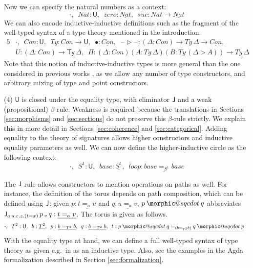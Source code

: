 \documentclass[dvipsnames]{lmcs} %
\makeatletter
\DeclareRobustCommand{\sqcdot}{\mathbin{\mathpalette\morphic@sqcdot\relax}}
\newcommand{\morphic@sqcdot}[2]{%
  \sbox\z@{$\m@th#1\centerdot$}%
  \ht\z@=.33333\ht\z@
  \vcenter{\box\z@}%
}
\newcommand{\U}{\mathsf{U}}
\newcommand{\ra}{\rightarrow}
\newcommand{\Ty}{\mathsf{Ty}}
\newcommand{\blank}{\mathord{\hspace{1pt}\text{--}\hspace{1pt}}}
\newcommand{\1}{\mathsf{1}} \renewcommand{\Pr}{\mathsf{Pr}}
\theoremstyle{plain}\newtheorem{satz}[thm]{Satz} %
\makeatother
\begin{document}
Now we can specify the natural numbers as a context:
\[
\boldsymbol{\cdot},\,\,\,Nat : \U,\,\,\,zero:\underline{Nat},\,\,\,suc:Nat\ra\underline{Nat}
\]
We can also encode inductive-inductive definitions such as the
fragment of the well-typed syntax of a type theory mentioned in the
introduction:
\begin{alignat*}{5}
  & \boldsymbol{\cdot},\,\,\,Con:\U,\,\,\,Ty:Con\ra\U,\,\,\,\bullet:\underline{Con},\,\,\,\blank\rhd\blank:(\Delta:Con)\ra Ty\,\Delta\ra\underline{Con}, \\
  & U : (\Delta:Con)\ra \underline{\Ty\,\Delta},\,\,\,\Pi:(\Delta:Con)(A:Ty\,\Delta)(B:Ty\,(\Delta\rhd A))\ra\underline{Ty\,\Delta}
\end{alignat*}
Note that this notion of inductive-inductive types is more general than the one
considered in previous works \cite{forsberg-phd}, as we allow any number of type
constructors, and arbitrary mixing of type and point constructors.

(4) $\U$ is closed under the equality type, with eliminator $\mathsf{J}$ and a weak
(propositional) $\beta$-rule. Weakness is required because the translations in
Sections \ref{sec:morphisms} and \ref{sec:sections} do not preserve this
$\beta$-rule strictly. We explain this in more detail in Sections
\ref{sec:coherence} and \ref{sec:categorical}. Adding equality to the theory of
signatures allows higher constructors and inductive equality parameters as well. We
can now define the higher-inductive circle as the following context:
\[
\boldsymbol{\cdot},\,\,\,S^1:\U,\,\,\,base:\underline{S^1},\,\,\,loop:\underline{base =_{S^1} base}
\]

The $\mathsf{J}$ rule allows constructors to mention operations on paths as well. For
instance, the definition of the torus depends on path composition, which can be
defined using $\mathsf{J}$: given $p:\underline{t=_a u}$ and $q:\underline{u=_a v}$, $p
\sqcdot q$ abbreviates $\mathsf{J}_{a\,u\,x.z.(t=x)}\,p\,_v\,q : \underline{t=_a
  v}$. The torus is given as follows.
\begin{alignat*}{5}
  & \boldsymbol{\cdot},\,\,\,T^2:\U,\,\,\,b : \underline{T^2},\,\,\, p:\underline{b =_{T^2} b},\,\,\,q:\underline{b=_{T^2} b},\,\,\, t:\underline{p\sqcdot q=_{(b=_{T^2} b)} q\sqcdot p}
\end{alignat*}
With the equality type at hand, we can define a full well-typed syntax of type
theory as given e.g.\ in \cite{ttintt} as an inductive type.  Also, see the
examples in the Agda formalization described in Section
\ref{sec:formalization}.
\end{document}
